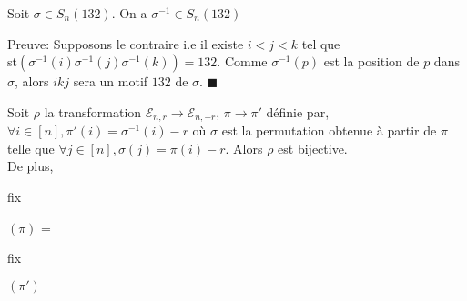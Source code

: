 \begin{lemme} \label{l100}
	Soit $\sigma \in S_{n}(132)$. On a $\sigma^{-1}\in S_{n}(132)$
\end{lemme}
Preuve: Supposons le contraire i.e il existe $i<j<k$ tel que \\st$(\sigma^{-1}(i)\sigma^{-1}(j)\sigma^{-1}(k))=132$. Comme $\sigma^{-1}(p)$ est la position de $p$ dans $\sigma$, alors $ikj$ sera un motif $132$ de $\sigma$. $\blacksquare$\vspace{5pt}\\
\begin{proposition}\label{p6}
	Soit $\rho$ la transformation $\mathcal{E}_{n,r} \longrightarrow \mathcal{E}_{n, -r}$, $\pi \longrightarrow \pi'$ définie par, $\forall  i\in [n], \pi'(i)=\sigma^{-1}(i)-r$ où $\sigma$ est la permutation obtenue à partir de $\pi$ telle que $\forall j \in [n], \sigma(j)=\pi(i)-r$. Alors $\rho$ est bijective.\\
	De plus, \begin{rm}fix\end{rm}$(\pi)$ = \begin{rm}fix\end{rm}$(\pi')$

\end{proposition}

